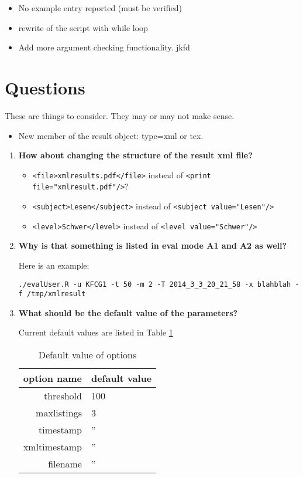 \documentclass{scrartcl}
\begin{document}
\begin{itemize}
\item No example entry reported (must be verified)
\item rewrite of the script with while loop
\item Add more argument checking functionality.
jkfd
\end{itemize}

\section{Questions}
These are things to consider. They may or may not make sense. 
\begin{itemize}
\item New member of the result object: type=xml or tex.
\end{itemize}
\begin{enumerate}
\item\label{q:xmlstructure}\textbf{How about changing the structure of the result xml file?}
\begin{itemize}
\item \verb+<file>xmlresults.pdf</file>+ instead of \verb+<print file="xmlresult.pdf"/>+?
\item \verb+<subject>Lesen</subject>+ instead of \verb+<subject value="Lesen"/>+
\item \verb+<level>Schwer</level>+ instead of \verb+<level value="Schwer"/>+
\end{itemize}
\item\label{q:A1andA2}\textbf{Why is that something is listed in eval mode A1 and A2 as well?}

Here is an example:
\begin{verbatim}
./evalUser.R -u KFCG1 -t 50 -m 2 -T 2014_3_3_20_21_58 -x blahblah -f /tmp/xmlresult
\end{verbatim}
\item\label{q:defaults}\textbf{What should be the default value of the parameters?}
 
Current default values are listed in Table \ref{tab:op}
\begin{table}
\begin{center}
\begin{tabular}{rl}
\hline
option name & default value\\
\hline
threshold & 100\\
maxlistings & 3\\
timestamp & ''\\
xmltimestamp & ''\\
filename & ''\\
\hline
\end{tabular}
\end{center}
\caption{Default value of options}
\label{tab:op}
\end{table}

\end{enumerate}
\end{document}
